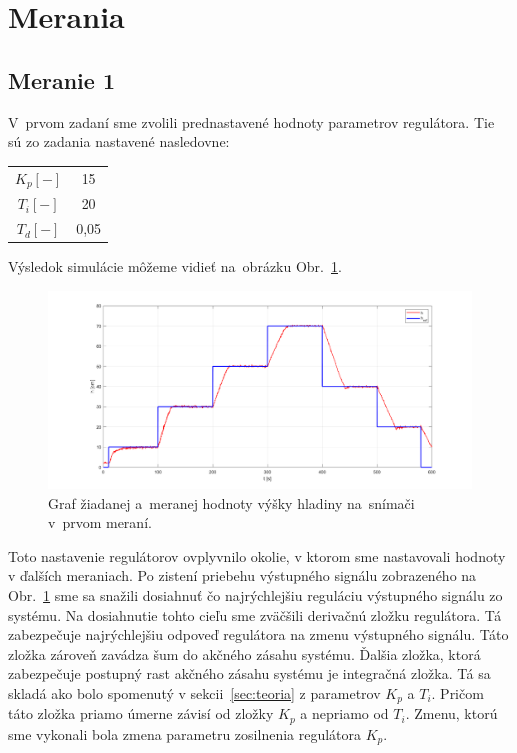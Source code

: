 \documentclass{article}
\begin{document}
\newpage

\section{Merania}
\label{sec:merania}

\subsection{Meranie 1}
\label{sec:meranie1}

V~prvom zadaní sme zvolili prednastavené hodnoty parametrov regulátora. Tie sú zo zadania nastavené nasledovne:

\begin{center}
\begin{tabular}{ |c|c| }
 \hline
 $K_p [-]$ & 15 \\
 $T_i [-]$ & 20 \\
 $T_d [-]$ & 0,05 \\
 \hline
\end{tabular}
\end{center}

Výsledok simulácie môžeme vidieť na~obrázku Obr.~\ref{fig:m1}.

\begin{figure}[!htbp]
	\begin{center}
		\includegraphics[width=\textwidth]{./include/meranie1.png}
	\end{center}
	\caption{Graf žiadanej a~meranej hodnoty výšky hladiny na~snímači v~prvom meraní.}
	\label{fig:m1}
\end{figure}

Toto nastavenie regulátorov ovplyvnilo okolie, v ktorom sme nastavovali hodnoty v ďalších meraniach. Po zistení
priebehu výstupného signálu zobrazeného na Obr.~\ref{fig:m1} sme sa snažili dosiahnuť čo najrýchlejšiu reguláciu
výstupného signálu zo systému. Na dosiahnutie tohto cieľu sme zväčšili derivačnú zložku regulátora.
Tá zabezpečuje najrýchlejšiu odpoveď regulátora na zmenu výstupného signálu. Táto zložka zároveň zavádza šum
do akčného zásahu systému. Ďalšia zložka, ktorá zabezpečuje postupný rast akčného zásahu systému je integračná
zložka. Tá sa skladá ako bolo spomenutý v sekcii~\ref{sec:teoria} z parametrov $K_p$ a $T_i$. Pričom táto zložka
priamo úmerne závisí od zložky $K_p$ a nepriamo od $T_i$. Zmenu, ktorú sme vykonali bola zmena parametru
zosilnenia regulátora $K_p$.
\end{document}
